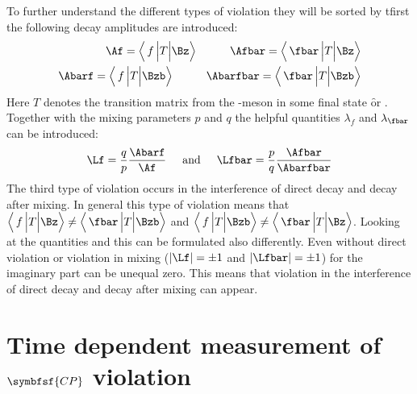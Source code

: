 To further understand
the different types of \CP violation they will be sorted by tfirst the following decay amplitudes are introduced:
\begin{equation}
\begin{split}
\Af = \left<\,f\,\Big|T\Big|\Bz\right>\hspace{1cm}\Afbar = \left<\,\fbar\,\Big|T\Big|\Bz\right>\\
\Abarf = \left<\,f\,\Big|T\Big|\Bzb\right>\hspace{1cm}\Abarfbar = \left<\,\fbar\,\Big|T\Big|\Bzb\right>
\end{split}
\end{equation}
Here $T$ denotes the transition matrix from the \B-meson in some final state \f or \fbar. Together with the
mixing parameters $p$ and $q$ the helpful quantities $\lambda_f$ and $\lambda_{\fbar}$ can be introduced:
\begin{equation}
\Lf=\frac{q}{p}\frac{\Abarf}{\Af}\hspace{0.5cm}\text{and}
\hspace{0.5cm}\Lfbar=\frac{p}{q}\frac{\Afbar}{\Abarfbar}
\end{equation}
The third type of \CP violation occurs in the interference of direct decay and decay after mixing. In general this type of \CP
violation means that $\left<\,f\,\Big|T\Big|\Bz\right>\neq\left<\,\fbar\,\Big|T\Big|\Bzb\right>$ and
$\left<\,f\,\Big|T\Big|\Bzb\right>\neq\left<\,\fbar\,\Big|T\Big|\Bz\right>$. Looking at the quantities \Lf and \Lfbar this can
be formulated also differently. Even without direct \CP violation or \CP violation in mixing ($\left|\Lf\right|=\pm1$ and
$\left|\Lfbar\right|=\pm1$) for the imaginary part can be unequal zero. This means that \CP violation in the interference of
direct decay and decay after mixing can appear.

\section[head={Time dependent measurement of \CP violation},tocentry={Time dependent measurement of \CP violation}]
{Time dependent measurement of $\symbfsf{C{}P}$ violation}
\label{sec:TimeDependentCPV}

